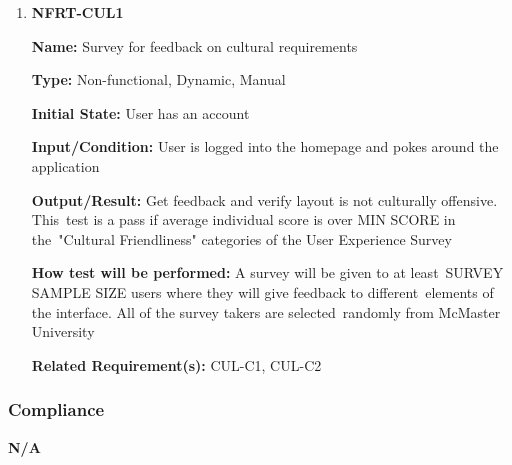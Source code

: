 \documentclass[12pt, titlepage]{article}
\begin{document}
\begin{enumerate}
\item{\textbf{NFRT-CUL1}}

\textbf{Name:} Survey for feedback on cultural requirements

\textbf{Type:} Non-functional, Dynamic, Manual

\textbf{Initial State:} User has an account

\textbf{Input/Condition:} User is logged into the homepage and pokes around the application

\textbf{Output/Result:} Get feedback and verify layout is not culturally offensive. This\
test is a pass if average individual score is over MIN SCORE in the\
"Cultural Friendliness" categories of the User Experience Survey

\textbf{How test will be performed:} A survey will be given to at least\
SURVEY SAMPLE SIZE users where they will give feedback to different\
elements of the interface. All of the survey takers are selected\
randomly from McMaster University

\textbf{Related Requirement(s):} CUL-C1, CUL-C2

\end{enumerate}

\subsubsection{Compliance}

\quad \textbf{N/A}
\end{document}
